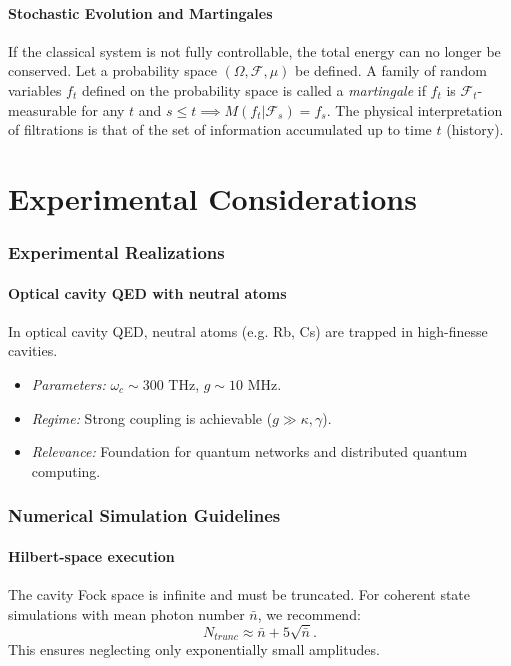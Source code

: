 \documentclass[11pt,a4paper]{article}
\theoremstyle{definition}
\begin{document}
\subsection{Stochastic Evolution and Martingales}

If the classical system is not fully controllable, the total energy can no longer be conserved.
Let a probability space $(\Omega, \mathcal{F}, \mu)$ be defined. A family of random variables $f_t$ defined on the probability space is called a \emph{martingale} if $f_t$ is $\mathcal{F}_t$-measurable for any $t$ and $s \le t \implies M(f_t | \mathcal{F}_s) = f_s$.
The physical interpretation of filtrations is that of the set of information accumulated up to time $t$ (history).

\part{Experimental Considerations}

\section{Experimental Realizations}
\label{sec:experiments}

\subsection{Optical cavity QED with neutral atoms}
In optical cavity QED, neutral atoms (e.g. Rb, Cs) are trapped in high-finesse cavities.
\begin{itemize}
    \item \emph{Parameters:} $\omega_c \sim 300$ THz, $g \sim 10$ MHz.
    \item \emph{Regime:} Strong coupling is achievable ($g \gg \kappa, \gamma$).
    \item \emph{Relevance:} Foundation for quantum networks and distributed quantum computing.
\end{itemize}


\section{Numerical Simulation Guidelines}
\label{sec:numerics}

\subsection{Hilbert-space execution}
The cavity Fock space is infinite and must be truncated.
For coherent state simulations with mean photon number $\bar{n}$, we recommend:
\begin{equation}
  N_{trunc} \approx \bar{n} + 5\sqrt{\bar{n}}.
\end{equation}
This ensures neglecting only exponentially small amplitudes.
\end{document}
